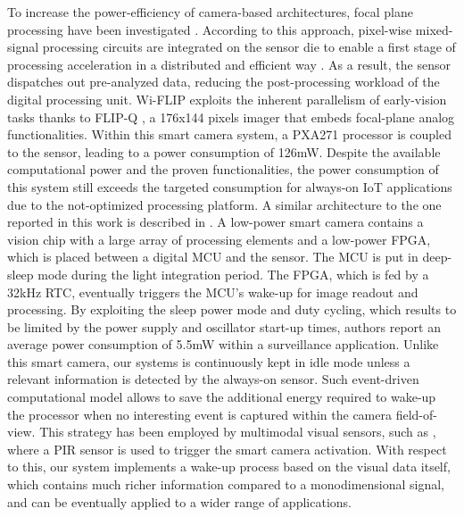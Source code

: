 \documentclass[journal]{IEEEtran}
\begin{document}
To increase the power-efficiency of camera-based architectures, focal plane processing have been investigated \cite{Fernandez2016}. According to this approach, pixel-wise mixed-signal processing circuits are integrated on the sensor die to enable a first stage of processing acceleration in a distributed and efficient way \cite{Kim2013,Park2014,Choi2014}. 
As a result, the sensor dispatches out pre-analyzed data, reducing the post-processing workload of the digital processing unit. Wi-FLIP \cite{Fernandez2011} exploits the inherent parallelism of early-vision tasks thanks to FLIP-Q \cite{Fernandez2012}, a 176x144 pixels imager that embeds focal-plane analog functionalities. Within this smart camera system, a PXA271 processor is coupled to the sensor, leading to a power consumption of 126mW. 
Despite the available computational power and the proven functionalities, the power consumption of this system still exceeds the targeted consumption for always-on IoT applications due to the not-optimized processing platform. 
A similar architecture to the one reported in this work is described in \cite{Carey2013}. A low-power smart camera contains a vision chip with a large array of processing elements and a low-power FPGA, which is placed between a digital MCU and the sensor. The MCU is put in deep-sleep mode during the light integration period. The FPGA, which is fed by a 32kHz RTC, eventually triggers the MCU's wake-up for image readout and processing. By exploiting the sleep power mode and duty cycling, which results to be limited by the power supply and oscillator start-up times, authors report an average power consumption of 5.5mW within a surveillance application. 
Unlike this smart camera, our systems is continuously kept in idle mode unless a relevant information is detected by the always-on sensor. Such event-driven computational model allows to save the additional energy required to wake-up the processor when no interesting event is captured within the camera field-of-view. This strategy has been employed by multimodal visual sensors, such as \cite{Magno2013}, where a PIR sensor is used to trigger the smart camera activation. With respect to this, our system implements a wake-up process based on the visual data itself, which contains much richer information compared to a monodimensional signal, and can be eventually applied to a wider range of applications. 
\end{document}
